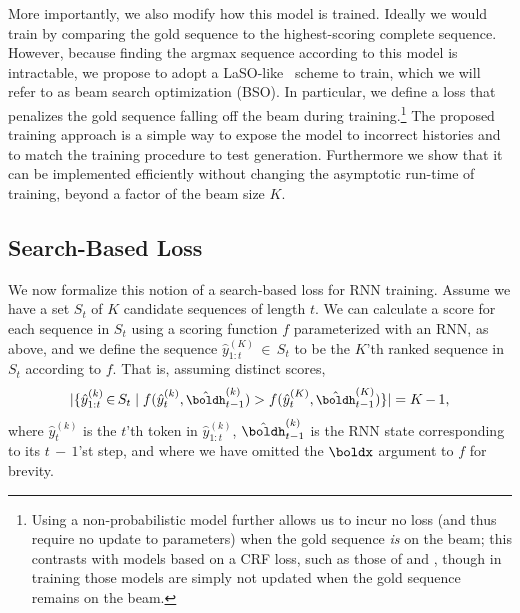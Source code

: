\documentclass[11pt,letterpaper]{article}
\newcommand{\beampred}[2]{\ensuremath{\hat{y}_{1:{#1}}^{({#2})}}}
\newcommand{\nicein}{\ensuremath{\,{\in}\,}}
\begin{document}
More importantly, we also modify how this model is
trained. Ideally we would train by comparing the gold sequence to the
highest-scoring complete sequence. However, because finding the
argmax sequence according to this model is intractable, we
propose to adopt a LaSO-like~\cite{daume05learning} scheme to train, which we will refer to as beam search optimization (BSO). In particular, we define a loss that
penalizes the gold sequence falling off the beam during
training.\footnote{Using a non-probabilistic model further allows us
  to incur no loss (and thus require no update to parameters) when the
  gold sequence \textit{is} on the beam; this contrasts with models
  based on a CRF loss, such as those of  and
  , though in training those models are simply not
  updated when the gold sequence remains on the beam.} The proposed
training approach is a simple way to expose the model to incorrect
histories and to match the training procedure to test
generation. Furthermore we show that it can be implemented efficiently
without changing the asymptotic run-time of training, beyond a factor
of the beam size $K$.











\subsection{Search-Based Loss}
We now formalize this notion of a search-based loss for RNN training. Assume we have a
set $S_t$ of $K$ candidate sequences of length $t$. We can calculate a
score for each sequence in $S_t$ using a scoring function $f$
parameterized with an RNN, as above, and we define the
sequence $\beampred{t}{K} \nicein S_t$ to be the $K$'th
ranked sequence in $S_t$ according to $f$. That is, assuming
distinct scores, 
\begin{align*}
\small
|\{ \beampred{t}{k} \nicein S_t \mid f(\hat{y}_t^{(k)}, \hat{\boldh}_{t-1}^{(k)}) > f(\hat{y}_t^{(K)}, \hat{\boldh}_{t-1}^{(K)})\}|
=
K\,{-}\,1,
\end{align*}
where $\hat{y}_t^{(k)}$ is the $t$'th token in $\beampred{t}{k}$,
$\hat{\boldh}_{t-1}^{(k)}$ is the RNN state corresponding to its
$t\,{-}\,1$'st step, and where we have omitted the $\boldx$ argument to $f$ for brevity. 
\end{document}
